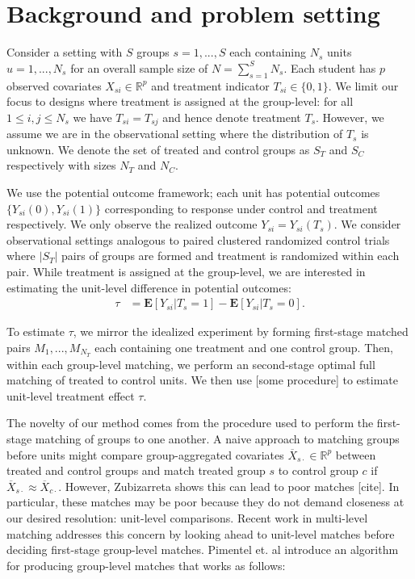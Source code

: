 \documentclass[aoas]{imsart}
\theoremstyle{plain}
\theoremstyle{definition}
\begin{document}
\section{Background and problem setting}
Consider a setting with $S$ groups $s = 1, ..., S$ each containing $N_s$ units $u = 1, ..., N_s$ for an overall sample size of $N = \sum_{s=1}^{S} N_s$. Each student has $p$ observed covariates $X_{si} \in \mathbb{R}^{p}$ and treatment indicator $T_{si} \in \{0, 1\}$. We limit our focus to designs where treatment is assigned at the group-level: for all $1 \leq i,j \leq N_s$ we have $T_{si} = T_{sj}$ and hence denote treatment $T_s$. However, we assume we are in the observational setting where the distribution of $T_s$ is unknown. We denote the set of treated and control groups as $S_T$ and $S_C$ respectively with sizes $N_T$ and $N_C$. 

We use the potential outcome framework; each unit has potential outcomes $\{Y_{si}(0), Y_{si}(1)\}$ corresponding to response under control and treatment respectively. We only observe the realized outcome $Y_{si} = Y_{si}(T_{s})$. We consider observational settings analogous to paired clustered randomized control trials where $|S_T|$ pairs of groups are formed and treatment is randomized within each pair. While treatment is assigned at the group-level, we are interested in estimating the unit-level difference in potential outcomes:
\begin{align*}
  \tau &= \mathbf{E}[Y_{si} | T_s = 1 ] - \mathbf{E}[Y_{si} | T_s = 0].
\end{align*}

To estimate $\tau$, we mirror the idealized experiment by forming first-stage matched pairs $M_1, ..., M_{N_T}$ each containing one treatment and one control group. Then, within each group-level matching, we perform an second-stage optimal full matching of treated to control units. We then use [some procedure] to estimate unit-level treatment effect $\tau$. 

The novelty of our method comes from the procedure used to perform the first-stage matching of groups to one another.  A naive approach to matching groups before units might compare group-aggregated covariates $\overline{X}_{s \cdot} \in \mathbb{R}^p$ between treated and control groups and match treated group $s$ to control group $c$ if $\overline{X}_{s \cdot} \approx \overline{X}_{c \cdot}$. However, Zubizarreta shows this can lead to poor matches [cite]. In particular, these matches may be poor because they do not demand closeness at our desired resolution: unit-level comparisons. Recent work in multi-level matching addresses this concern by looking ahead to unit-level matches before deciding first-stage group-level matches. Pimentel et. al introduce an algorithm for producing group-level matches that works as follows:
\end{document}
